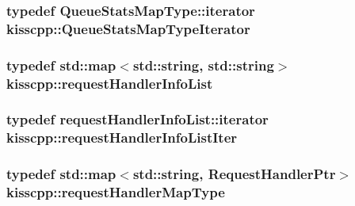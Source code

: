 \hypertarget{namespacekisscpp_a108455a00c9a8ea1f3416c5cab767bbe}{
\subsubsection[{Queue\-Stats\-Map\-Type\-Iterator}]{\setlength{\rightskip}{0pt plus 5cm}typedef Queue\-Stats\-Map\-Type\-::iterator {\bf kisscpp\-::\-Queue\-Stats\-Map\-Type\-Iterator}}}\label{namespacekisscpp_a108455a00c9a8ea1f3416c5cab767bbe}
\hypertarget{namespacekisscpp_a403fe12b3fa48680ec27f8af4286383b}{
\subsubsection[{request\-Handler\-Info\-List}]{\setlength{\rightskip}{0pt plus 5cm}typedef std\-::map$<$std\-::string, std\-::string$>$ {\bf kisscpp\-::request\-Handler\-Info\-List}}}\label{namespacekisscpp_a403fe12b3fa48680ec27f8af4286383b}
\hypertarget{namespacekisscpp_a9b5b819d32c8f71acb0a5b292303b8e1}{
\subsubsection[{request\-Handler\-Info\-List\-Iter}]{\setlength{\rightskip}{0pt plus 5cm}typedef request\-Handler\-Info\-List\-::iterator {\bf kisscpp\-::request\-Handler\-Info\-List\-Iter}}}\label{namespacekisscpp_a9b5b819d32c8f71acb0a5b292303b8e1}
\hypertarget{namespacekisscpp_acaaba8d5ee3dd772dbf008749245c357}{
\subsubsection[{request\-Handler\-Map\-Type}]{\setlength{\rightskip}{0pt plus 5cm}typedef std\-::map$<$std\-::string, {\bf Request\-Handler\-Ptr}$>$ {\bf kisscpp\-::request\-Handler\-Map\-Type}}}\label{namespacekisscpp_acaaba8d5ee3dd772dbf008749245c357}
